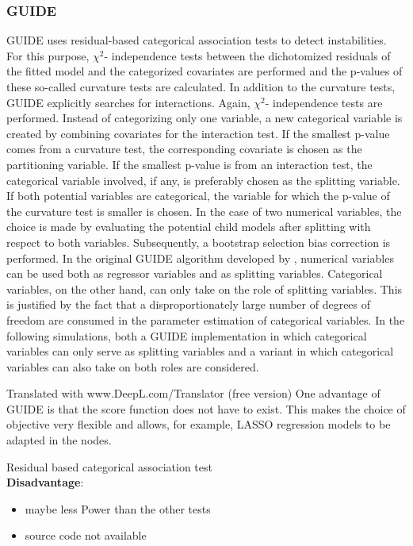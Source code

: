 \subsubsection{GUIDE}
GUIDE \citep{.2002} uses residual-based categorical association tests to detect instabilities. For this purpose, $\chi^2$- independence tests between the dichotomized residuals of the fitted model and the categorized covariates are performed and the p-values of these so-called curvature tests are calculated. In addition to the curvature tests, GUIDE explicitly searches for interactions.  Again, $\chi^2$- independence tests are performed. Instead of categorizing only one variable, a new categorical variable is created by combining covariates for the interaction test. If the smallest p-value comes from a curvature test, the corresponding covariate is chosen as the partitioning variable. If the smallest p-value is from an interaction test, the categorical variable involved, if any, is preferably chosen as the splitting variable. If both potential variables are categorical, the variable for which the p-value of the curvature test is smaller is chosen. In the case of two numerical variables, the choice is made by evaluating the potential child models after splitting with respect to both variables.
Subsequently, a bootstrap selection bias correction is performed.
In the original GUIDE algorithm developed by \citep{.2002}, numerical variables can be used both as regressor variables and as splitting variables. Categorical variables, on the other hand, can only take on the role of splitting variables. This is justified by the fact that a disproportionately large number of degrees of freedom are consumed in the parameter estimation of categorical variables.
In the following simulations, both a GUIDE implementation in which categorical variables can only serve as splitting variables and a variant in which categorical variables can also take on both roles are considered. 

Translated with www.DeepL.com/Translator (free version)
One advantage of GUIDE is that the score function does not have to exist. This makes the choice of objective very flexible and allows, for example, LASSO regression models to be adapted in the nodes.




Residual based categorical association test\\
\textbf{Disadvantage}: 
\begin{itemize}
    \item maybe less Power than the other tests
    \item source code not available \citep{Loh.2014}
\end{itemize}

